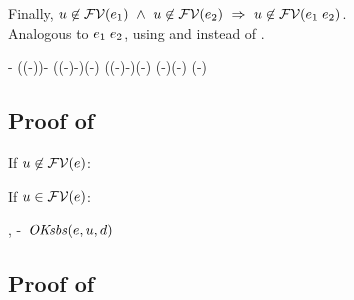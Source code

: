 \begin{bycase}
\noindent
Finally,
$u\not\in\mathcal{FV}(e_1)\ \wedge\ u\not\in\mathcal{FV}(e_2)\ \Rightarrow\ 
 u\not\in\mathcal{FV}(e_1\;e_2)$.
\Case{$\eqO$, $\iifO$}\\
Analogous to $e_1\;e_2$, using  and 
instead of .
\Case{$\absO$}
\begin{derivation}
\step{\varI\in\efvar{\absO}}{\hyp}
\step{\esbsokO{\absO}}{\hyp}
\steP
{\efvar{\esbsO{(\absO)}}
 \efvar{\abs{\var}{\typ}{\esbsO{\expr}}}
 \linK{=}
 \efvar{\esbsO{\expr}}-\setI{\var}
 ((\efvar{\expr}-\setI{\varI})\cup\efvar{\exprI})-\setI{\var}
 \linK{=}
 ((\efvar{\expr}-\setI{\varI})-\setI{\var})\cup(\efvar{\exprI}-\setI{\var})
 \linK{=}
 ((\efvar{\expr}-\setI{\var})-\setI{\varI})\cup(\efvar{\exprI}-\setI{\var})
 (\efvar{\absO}-\setI{\varI})\cup(\efvar{\exprI}-\setI{\var})
 (\efvar{\absO}-\setI{\varI})\cup\efvar{\exprI}}
\end{derivation}
\end{bycase}



\subsection*{Proof of }

If $u\not\in\mathcal{FV}(e)$:
\begin{derivation}
\end{derivation}

\noindent
If $u\in\mathcal{FV}(e)$:
\begin{derivation}
\step{\efvar{\esbsO{\expr}}=(\efvar{\expr}-\setI{\varI})\cup\efvar{\exprI}}
     {, \hyp\ $\mathit{OKsbs}(e,u,d)$}
\steP{\varI\not\in\efvar{\expr}-\setI{\varI}}
\step{\varI\not\in\efvar{\exprI}}{\hyp}
\end{derivation}



\subsection*{Proof of }

